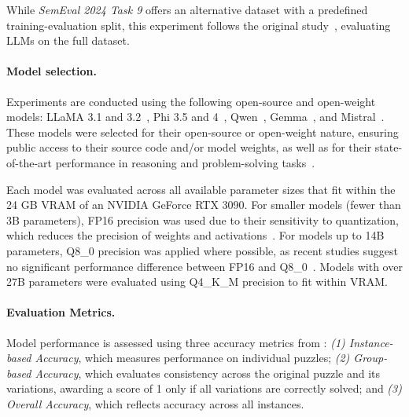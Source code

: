While \textit{SemEval 2024 Task 9} offers an alternative dataset with a predefined training-evaluation split, this experiment follows the original study~\cite{jiangBRAINTEASERLateralThinking2023}, evaluating \acp{LLM} on the full dataset.

\paragraph{Model selection.}
Experiments are conducted using the following open-source and open-weight models: \ac{LLaMA} 3.1 and 3.2~\cite{grattafioriLlama3Herd2024}, \acs{Phi} 3.5 and 4~\cite{abdinPhi3TechnicalReport2024, abdinPhi4TechnicalReport2024}, \acs{Qwen}~\cite{qwenQwen25TechnicalReport2025}, \acs{Gemma}~\cite{teamGemma2Improving2024}, and \acs{Mistral}~\cite{MistralNeMoMistral}. These models were selected for their open-source or open-weight nature, ensuring public access to their source code and/or model weights, as well as for their state-of-the-art performance in reasoning and problem-solving tasks~\cite{grattafioriLlama3Herd2024, abdinPhi3TechnicalReport2024, abdinPhi4TechnicalReport2024, qwenQwen25TechnicalReport2025, teamGemma2Improving2024, MistralNeMoMistral}.

Each model was evaluated across all available parameter sizes that fit within the 24 GB \ac{VRAM} of an NVIDIA GeForce RTX 3090. For smaller models (fewer than 3B parameters), FP16 precision was used due to their sensitivity to quantization, which reduces the precision of weights and activations~\cite{liEvaluatingQuantizedLarge2024}. For models up to 14B parameters, Q8\_0 precision was applied where possible, as recent studies suggest no significant performance difference between FP16 and Q8\_0~\cite{raubaQuantifyingPerturbationImpacts2024, liEvaluatingQuantizedLarge2024}. Models with over 27B parameters were evaluated using Q4\_K\_M precision to fit within \ac{VRAM}.

\paragraph{Evaluation Metrics.}
\label{evaluation-metrics}
Model performance is assessed using three accuracy metrics from \textcite{jiangBRAINTEASERLateralThinking2023}: \textit{(1) Instance-based Accuracy}, which measures performance on individual puzzles; \textit{(2) Group-based Accuracy}, which evaluates consistency across the original puzzle and its variations, awarding a score of 1 only if all variations are correctly solved; and \textit{(3) Overall Accuracy}, which reflects accuracy across all instances.

